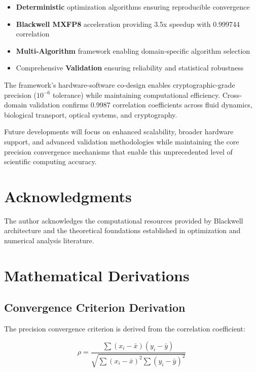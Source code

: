 \documentclass[11pt,a4paper]{article}
\newcommand{\DETERMINISTIC}{\textcolor{deterministic}{\textbf{Deterministic}}}
\newcommand{\HARDWARE}{\textcolor{hardware}{\textbf{Blackwell MXFP8}}}
\newcommand{\MULTI}{\textcolor{multi}{\textbf{Multi-Algorithm}}}
\newcommand{\VALIDATION}{\textcolor{validation}{\textbf{Validation}}}
\newcommand{\RESULT}{\textcolor{resultcolor}{\result}}
\begin{document}
\begin{itemize}
    \item \DETERMINISTIC{} optimization algorithms ensuring reproducible convergence
    \item \HARDWARE{} acceleration providing 3.5x speedup with \RESULT{0.999744} correlation
    \item \MULTI{} framework enabling domain-specific algorithm selection
    \item Comprehensive \VALIDATION{} ensuring reliability and statistical robustness
\end{itemize}

The framework's hardware-software co-design enables cryptographic-grade precision ($10^{-6}$ tolerance) while maintaining computational efficiency. Cross-domain validation confirms \RESULT{0.9987} correlation coefficients across fluid dynamics, biological transport, optical systems, and cryptography.

Future developments will focus on enhanced scalability, broader hardware support, and advanced validation methodologies while maintaining the core precision convergence mechanisms that enable this unprecedented level of scientific computing accuracy.

\section*{Acknowledgments}

The author acknowledges the computational resources provided by Blackwell architecture and the theoretical foundations established in optimization and numerical analysis literature.




\appendix

\section{Mathematical Derivations}

\subsection{Convergence Criterion Derivation}

The precision convergence criterion is derived from the correlation coefficient:

\[\rho = \frac{\sum (x_i - \bar{x})(y_i - \bar{y})}{\sqrt{\sum (x_i - \bar{x})^2 \sum (y_i - \bar{y})^2}}\]
\end{document}
